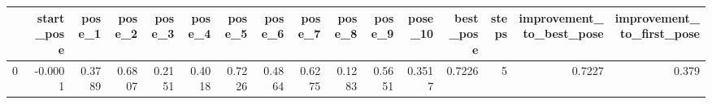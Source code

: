 \begin{tabular}{lrrrrrrrrrrrrrrr}
\toprule
{} &  start\_pose &  pose\_1 &  pose\_2 &  pose\_3 &  pose\_4 &  pose\_5 &  pose\_6 &  pose\_7 &  pose\_8 &  pose\_9 &  pose\_10 &  best\_pose &  steps &  improvement\_to\_best\_pose &  improvement\_to\_first\_pose \\
\midrule
0 &     -0.0001 &  0.3789 &  0.6807 &  0.2151 &  0.4018 &  0.7226 &  0.4864 &  0.6275 &  0.1283 &  0.5651 &   0.3517 &     0.7226 &      5 &                    0.7227 &                      0.379 \\
\bottomrule
\end{tabular}
